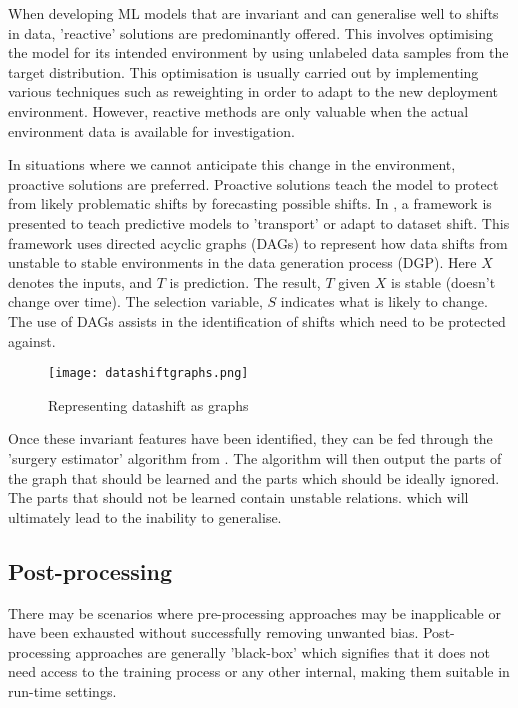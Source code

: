 When developing ML models that are invariant and can generalise well to shifts in data, ’reactive’ solutions are predominantly offered. 
This involves optimising the model for its intended environment by using unlabeled data samples from the target distribution.
This optimisation is usually carried out by implementing various techniques such as reweighting in order to adapt to the new deployment environment.
However, reactive methods are only valuable when the actual environment data is available for investigation. 

In situations where we cannot anticipate this change in the environment, proactive solutions are preferred.
Proactive solutions teach the model to protect from likely problematic shifts by forecasting possible shifts.
In \cite{subbaswamy2019preventing}, a framework is presented to teach predictive models to 'transport' or adapt to dataset shift.
This framework uses directed acyclic graphs (DAGs) to represent how data shifts from unstable to stable environments in the data generation process (DGP).
Here $X$ denotes the inputs, and $T$ is prediction. The result, $T$ given $X$ is stable (doesn't change over time).
The selection variable, $S$ indicates what is likely to change. The use of DAGs assists in the identification of shifts which need to be protected against.

\begin{figure}[H]
    \texttt{[image: datashiftgraphs.png]}
    \centering
    \caption{Representing datashift as graphs \cite{subbaswamy2019preventing}}
    \label{fig:DAG}
\end{figure}

Once these invariant features have been identified, they can be fed through the 'surgery estimator' algorithm from \cite{subbaswamy2019preventing}.
The algorithm will then output the parts of the graph that should be learned and the parts which should be ideally ignored.
The parts that should not be learned contain unstable relations. which will ultimately lead to the inability to generalise.

\subsection{Post-processing}
There may be scenarios where pre-processing approaches may be inapplicable or have been exhausted without successfully removing unwanted bias.
Post-processing approaches are generally 'black-box' which signifies that it does not need access to the training process or any other internal,  making them suitable in run-time settings.

